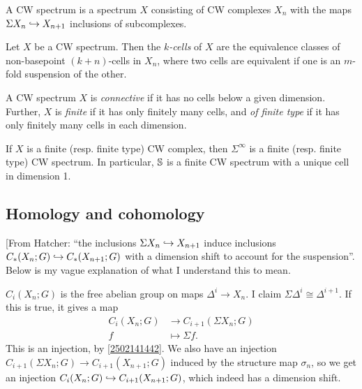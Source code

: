 \documentclass{MetricNotes2023}
\def\bb{\ensuremath\mathbb}
\def\inj{\ensuremath\hookrightarrow}
\begin{document}
\begin{definition}
A CW spectrum is a spectrum \(X\) consisting of CW complexes \(X_n\) with the maps \(\Sigma X_n \inj X_{n+1}\) inclusions of subcomplexes. 
\end{definition}

\begin{definition}
Let \(X\) be a CW spectrum. Then the \textit{\(k\)-cells} of \(X\) are the equivalence classes of non-basepoint \((k+n)\)-cells in \(X_n\), where two cells are equivalent if one is an \(m\)-fold suspension of the other. 
\end{definition}


\begin{definition}
A CW spectrum \(X\) is \textit{connective} if it has no cells below a given dimension. Further, \(X\) is \textit{finite} if it has only finitely many cells, and \textit{of finite type} if it has only finitely many cells in each dimension.
\end{definition}

\begin{example}
If \(X\) is a finite (resp. finite type) CW complex, then \(\Sigma^\infty\) is a finite (resp. finite type) CW spectrum. In particular, \(\bb{S}\) is a finite CW spectrum with a unique cell in dimension 1.
\end{example}

\subsection{Homology and cohomology}

[From Hatcher: ``the inclusions \(\Sigma X_n \inj X_{n+1}\) induce inclusions \(C_*(X_n; G)\inj C_*(X_{n+1}; G)\) with a dimension shift to account for the suspension''. Below is my vague explanation of what I understand this to mean.

\(C_i(X_n; G)\) is the free abelian group on maps \(\Delta^i \to X_n\). I claim \(\Sigma\Delta^i\cong \Delta^{i+1}\). If this is true, it gives a map
\begin{align*}
C_i(X_n;G) &\to C_{i+1}(\Sigma X_n; G)\\
f &\mapsto \Sigma f.
\end{align*}
This is an injection, by \ref{2502141442}. We also have an injection \(C_{i+1}(\Sigma X_n; G)\to C_{i+1}(X_{n+1}; G)\) induced by the structure map \(\sigma_n\), so we get an injection \(C_i(X_n;G)\inj C_{i+1}(X_{n+1};G)\), which indeed has a dimension shift.
\end{document}
